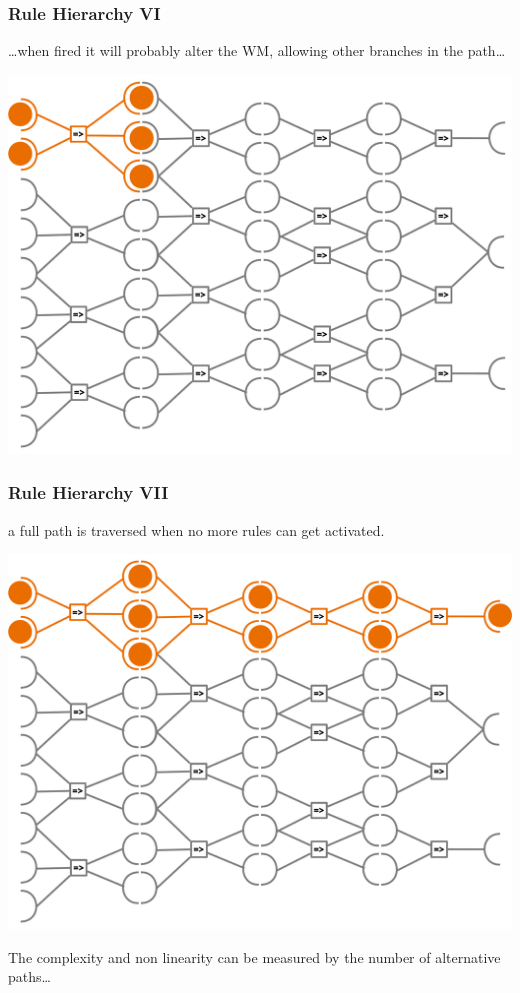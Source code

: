 \documentclass[xcolor={usenames,dvipsnames,svgnames}, compress]{beamer}
\begin{document}
\begin{frame}
  \frametitle{Rule Hierarchy VI}
  \dots when fired it will probably alter the WM, allowing other
  branches in the path\dots
  \begin{center}
    \includegraphics[width=0.7\linewidth]{Figures/rulesact-IIII}
  \end{center}
\end{frame}

\begin{frame}
  \frametitle{Rule Hierarchy VII}
  a full path is traversed when no more rules can get activated.
  \begin{center}
    \includegraphics[width=0.7\linewidth]{Figures/rulesact-V}
  \end{center}
  The complexity and non linearity can be measured by the number of
  alternative paths\dots
\end{frame}
\end{document}
